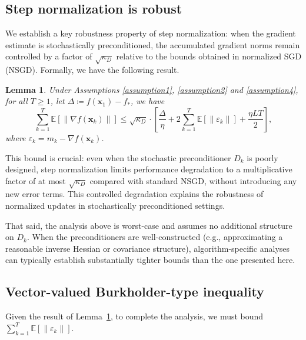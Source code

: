 \documentclass{article}
\newcommand{\bx}{\boldsymbol{x}}
\theoremstyle{plain}
\newtheorem{lemma}[theorem]{Lemma}
\theoremstyle{definition}
\theoremstyle{remark}
\begin{document}
\subsection{Step normalization is robust}

We establish a key robustness property of step normalization: when the gradient estimate is stochastically preconditioned, the accumulated gradient norms remain controlled by a factor of $\sqrt{\kappa_D}$ relative to the bounds obtained in normalized SGD (NSGD). Formally, we have the following result.
\begin{lemma}\label{lemma:normalization1}
Under Assumptions \ref{assumption1}, \ref{assumption2} and \ref{assumption4}, for all $T\geq 1$, let $\Delta \coloneqq f(\bx_1) - f_*$, we have\vskip-0.5cm
\begin{equation*}
\sum_{k=1}^T\mathbb{E}\left[\|\nabla f(\bx_k)\|\right] 
\leq \sqrt{\kappa_D} \cdot \left[\frac{\Delta}{\eta}   + 2  \sum_{k=1}^T\mathbb{E}\left[\|\varepsilon_k\|\right] + \frac{\eta L T}{2}\right],
\end{equation*}\vskip-0.2cm
\noindent where $\varepsilon_k=m_k-\nabla f(\bx_k)$.
\end{lemma}

This bound is crucial: even when the stochastic preconditioner $D_k$ is poorly designed, step normalization limits performance degradation to a multiplicative factor of at most $\sqrt{\kappa_D}$ compared with standard NSGD, without introducing any new error terms. This controlled degradation explains the robustness of normalized updates in stochastically preconditioned settings.

That said, the analysis above is worst-case and assumes no additional structure on $D_k$. When the preconditioners are well-constructed (e.g., approximating a reasonable inverse Hessian or covariance structure), algorithm-specific analyses can typically establish substantially tighter bounds than the one presented here.



\subsection{Vector-valued Burkholder-type inequality}

Given the result of Lemma~\ref{lemma:normalization1}, to complete the analysis, we must bound $\sum_{k=1}^T\mathbb{E}\left[\|\varepsilon_k\|\right]$.
\end{document}
